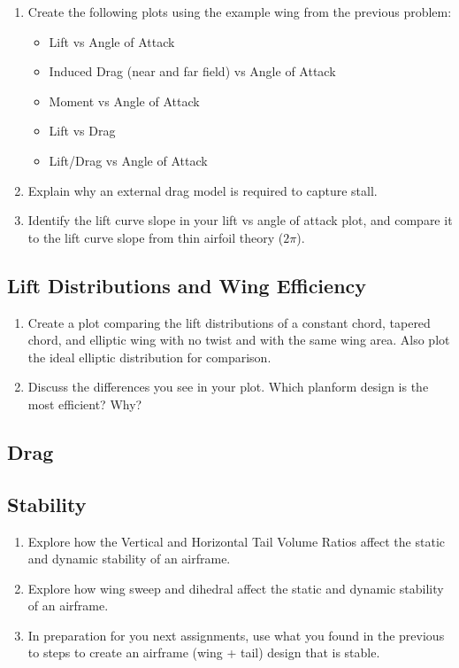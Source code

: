 \documentclass[11pt,twocolumn]{article}
\begin{document}
\begin{enumerate}[label=\roman*.]
	\item Create the following plots using the example wing from the previous problem:
	\begin{itemize}
		\item Lift vs Angle of Attack
		\item Induced Drag (near and far field) vs Angle of Attack
		\item Moment vs Angle of Attack
		\item Lift vs Drag
		\item Lift/Drag vs Angle of Attack
	\end{itemize}
	\item Explain why an external drag model is required to capture stall.
	\item Identify the lift curve slope in your lift vs angle of attack plot, and compare it to the lift curve slope from thin airfoil theory (\(2\pi\)).
\end{enumerate}

\subsection{Lift Distributions and Wing Efficiency}

\begin{enumerate}[label=\roman*.]
	\item Create a plot comparing the lift distributions of a constant chord, tapered chord, and elliptic wing with no twist and with the same wing area.  Also plot the ideal elliptic distribution for comparison.
	\item Discuss the differences you see in your plot.  Which planform design is the most efficient? Why?
\end{enumerate}

\subsection{Drag}

\subsection{Stability}

\begin{enumerate}[label=\roman*.]
	\item Explore how the Vertical and Horizontal Tail Volume Ratios affect the static and dynamic stability of an airframe.
	\item Explore how wing sweep and dihedral affect the static and dynamic stability of an airframe.
	\item In preparation for you next assignments, use what you found in the previous to steps to create an airframe (wing + tail) design that is stable.
\end{enumerate}
\end{document}
